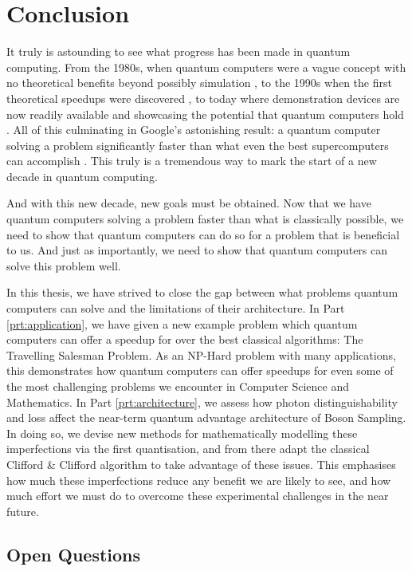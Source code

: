 \chapter{Conclusion}
\label{chp:conclusion}

It truly is astounding to see what progress has been made in quantum computing. From the 1980s, when quantum computers were a vague concept with no theoretical benefits beyond possibly simulation \cite{feynman1982}, to the 1990s when the first theoretical speedups were discovered \cite{shor1994, grover96}, to today where demonstration devices are now readily available and showcasing the potential that quantum computers hold \cite{rigetti, ibm}. All of this culminating in Google's astonishing result: a quantum computer solving a problem significantly faster than what even the best supercomputers can accomplish \cite{arute2019}. This truly is a tremendous way to mark the start of a new decade in quantum computing.

And with this new decade, new goals must be obtained. Now that we have quantum computers solving a problem faster than what is classically possible, we need to show that quantum computers can do so for a problem that is beneficial to us. And just as importantly, we need to show that quantum computers can solve this problem well.

In this thesis, we have strived to close the gap between what problems quantum computers can solve and the limitations of their architecture. In Part \ref{prt:application}, we have given a new example problem which quantum computers can offer a speedup for over the best classical algorithms: The Travelling Salesman Problem. As an NP-Hard problem with many applications, this demonstrates how quantum computers can offer speedups for even some of the most challenging problems we encounter in Computer Science and Mathematics. In Part \ref{prt:architecture}, we assess how photon distinguishability and loss affect the near-term quantum advantage architecture of Boson Sampling. In doing so, we devise new methods for mathematically modelling these imperfections via the first quantisation, and from there adapt the classical Clifford \& Clifford algorithm \cite{clifford2017} to take advantage of these issues. This emphasises how much these imperfections reduce any benefit we are likely to see, and how much effort we must do to overcome these experimental challenges in the near future.

\section{Open Questions}
\label{sec:oq}

